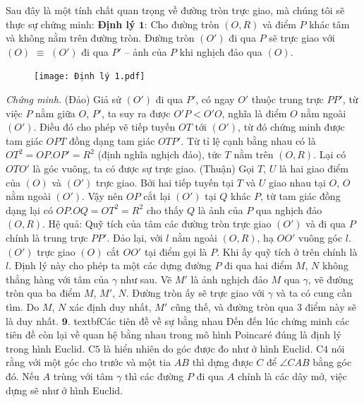 \begin{multicols}{2}
	\vskip 0.1cm
	Sau đây là một tính chất quan trọng về đường tròn trực giao, mà chúng tôi sẽ thực sự chứng minh:
	\vskip 0.1cm
	\textbf{\color{lichsutoanhoc}Định lý $\pmb{1}$}: Cho đường tròn $(O, R)$ và điểm $P$ khác tâm và không nằm trên đường tròn. Đường tròn $(O')$ đi qua $P$ sẽ trực giao với $(O)$ $ \equiv$ $(O')$ đi qua $P'$ -- ảnh của $P$ khi nghịch đảo qua $(O)$.
	\begin{figure}[H]
		\vspace*{-5pt}
		\centering
		\captionsetup{labelformat= empty, justification=centering}
		\texttt{[image: Định lý 1.pdf]}
		\vspace*{-10pt}
	\end{figure}
	\textit{Chứng minh.} (Đảo) Giả sử $(O')$ đi qua $P'$, có ngay $O'$ thuộc trung trực $PP'$, từ việc $P$ nằm giữa $O$, $P'$, ta suy ra được $O'P<O'O$, nghĩa là điểm $O$ nằm ngoài $(O')$. Điều đó cho phép vẽ tiếp tuyến $OT$ tới $(O')$, từ đó chứng minh được tam giác $OPT$ đồng dạng tam giác $OTP'$. Từ tỉ lệ cạnh bằng nhau có là $OT^2 = OP.OP' = R^2$ (định nghĩa nghịch đảo), tức $T$ nằm trên $(O, R)$. Lại có $OTO'$ là góc vuông, ta có được sự trực giao.
	\vskip 0.1cm
	(Thuận) Gọi $T$, $U$ là hai giao điểm của $(O)$ và $(O')$ trực giao. Bởi hai tiếp tuyến tại $T$ và $U$ giao nhau tại $O$, $O$ nằm ngoài $(O')$. Vậy nên $OP$ cắt lại $(O')$ tại $Q$ khác $P$, từ tam giác đồng dạng lại có $OP.OQ = OT^2 = R^2$ cho thấy $Q$ là ảnh của $P$ qua nghịch đảo $(O, R)$.
	\vskip 0.1cm
	Hệ quả: Quỹ tích của tâm các đường tròn trực giao $(O')$ và đi qua $P$ chính là trung trực $PP'$.
	\vskip 0.1cm
	Đảo lại, với $l$ nằm ngoài $(O, R)$, hạ $OO'$ vuông góc $l$. $(O')$ trực giao $(O)$ cắt $OO'$ tại điểm gọi là $P$. Khi ấy quỹ tích ở trên chính là $l$.
	\vskip 0.1cm
	Định lý này cho phép ta một các dựng đường $P$ đi qua hai điểm $M$, $N$ không thẳng hàng với tâm của $\gamma$ như sau. Vẽ $M'$ là ảnh nghịch đảo $M$ qua $\gamma$, vẽ đường tròn qua ba điểm $M$, $M'$, $N$. Đường tròn ấy sẽ trực giao với $\gamma$ và ta có cung cần tìm. Do $M$, $N$ xác định duy nhất, $M'$ cũng thế, và đường tròn qua $3$ điểm này sẽ là duy nhất.
	\vskip 0.1cm
	$\pmb{9.}$ textbf{\color{lichsutoanhoc}Các tiên đề về sự bằng nhau}
	\vskip 0.1cm
	Đến đến lúc chứng minh các tiên đề còn lại về quan hệ bằng nhau trong mô hình Poincaré đúng là định lý trong hình Euclid.
	\vskip 0.1cm
	C$5$ là hiển nhiên do góc được đo như ở hình Euclid. C$4$ nói rằng với một góc cho trước và một tia $AB$ thì dựng được $C$ để $ \angle CAB$ bằng góc đó. Nếu $A$ trùng với tâm $ \gamma$ thì các đường $P$ đi qua $A$ chính là các dây mở, việc dựng sẽ như ở hình Euclid.

\end{multicols}
